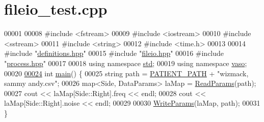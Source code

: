 \hypertarget{fileio__test_8cpp_source}{\section{fileio\+\_\+test.\+cpp}
\label{fileio__test_8cpp_source}
}

\begin{DoxyCode}
00001 
00008 \textcolor{preprocessor}{#include <fstream>}
00009 \textcolor{preprocessor}{#include <iostream>}
00010 \textcolor{preprocessor}{#include <sstream>}
00011 \textcolor{preprocessor}{#include <string>}
00012 \textcolor{preprocessor}{#include <time.h>}
00013 
00014 \textcolor{preprocessor}{#include "\hyperlink{definitions_8hpp}{definitions.hpp}"}
00015 \textcolor{preprocessor}{#include "\hyperlink{fileio_8hpp}{fileio.hpp}"}
00016 \textcolor{preprocessor}{#include "\hyperlink{process_8hpp}{process.hpp}"}
00017 
00018 \textcolor{keyword}{using namespace }\hyperlink{namespacestd}{std};
00019 \textcolor{keyword}{using namespace }\hyperlink{namespacevaso}{vaso};
00020 
\hypertarget{fileio__test_8cpp_source_l00024}{}\hyperlink{fileio__test_8cpp_ae66f6b31b5ad750f1fe042a706a4e3d4}{00024} \textcolor{keywordtype}{int} \hyperlink{fileio__test_8cpp_ae66f6b31b5ad750f1fe042a706a4e3d4}{main}() \{
00025     \textcolor{keywordtype}{string} path = \hyperlink{namespacevaso_a0f49c8240a13e7d853912ad78d5f53c9}{PATIENT\_PATH} + \textcolor{stringliteral}{"wizmack, sammy andy.csv"};
00026     map<Side, DataParams> laMap = \hyperlink{namespacevaso_afc1435dcb9c37b3ccde589738b26c909}{ReadParams}(path);
00027     cout <<  laMap[Side::Right].freq << endl;
00028     cout << laMap[Side::Right].noise << endl;
00029 
00030     \hyperlink{namespacevaso_ac272f5c7d73f350442d4657ef0258021}{WriteParams}(laMap, path);
00031 \}
\end{DoxyCode}
